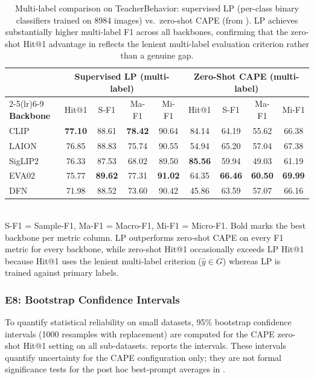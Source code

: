 \documentclass[electronics,article,submit,pdftex,moreauthors]{Definitions/mdpi}
\begin{document}
\begin{table}[H]
\caption{Multi-label comparison on TeacherBehavior: supervised LP (per-class binary classifiers trained on 8984 images) vs.\ zero-shot CAPE (from ). LP achieves substantially higher multi-label F1 across all backbones, confirming that the zero-shot Hit@1 advantage in  reflects the lenient multi-label evaluation criterion rather than a genuine gap.}
\label{tab:linear_probe_ml}
\centering
\small
\setlength{\tabcolsep}{3.5pt}
\begin{tabular}{l cccc cccc}
\toprule
 & \multicolumn{4}{c}{\textbf{Supervised LP (multi-label)}} & \multicolumn{4}{c}{\textbf{Zero-Shot CAPE (multi-label)}} \\
\cmidrule(lr){2-5}\cmidrule(lr){6-9}
\textbf{Backbone} & Hit@1 & S-F1 & Ma-F1 & Mi-F1 & Hit@1 & S-F1 & Ma-F1 & Mi-F1 \\
\midrule
CLIP & \textbf{77.10} & 88.61 & \textbf{78.42} & 90.64 & 84.14 & 64.19 & 55.62 & 66.38 \\
LAION & 76.85 & 88.83 & 75.74 & 90.55 & 54.94 & 65.20 & 57.04 & 67.38 \\
SigLIP2 & 76.33 & 87.53 & 68.02 & 89.50 & \textbf{85.56} & 59.94 & 49.03 & 61.19 \\
EVA02 & 75.77 & \textbf{89.62} & 77.31 & \textbf{91.02} & 64.35 & \textbf{66.46} & \textbf{60.50} & \textbf{69.99} \\
DFN & 71.98 & 88.52 & 73.60 & 90.42 & 45.86 & 63.59 & 57.07 & 66.16 \\
\bottomrule
\end{tabular}
\\[3pt]
{\footnotesize S-F1 = Sample-F1, Ma-F1 = Macro-F1, Mi-F1 = Micro-F1. Bold marks the best backbone per metric column. LP outperforms zero-shot CAPE on every F1 metric for every backbone, while zero-shot Hit@1 occasionally exceeds LP Hit@1 because Hit@1 uses the lenient multi-label criterion ($\hat{y}\in G$) whereas LP is trained against primary labels.}
\end{table}


\subsubsection{E8: Bootstrap Confidence Intervals}
\label{sec:e8_bootstrap}

To quantify statistical reliability on small datasets, 95\% bootstrap confidence intervals (1000 resamples with replacement) are computed for the CAPE zero-shot Hit@1 setting on all sub-datasets.  reports the intervals. These intervals quantify uncertainty for the CAPE configuration only; they are not formal significance tests for the post hoc best-prompt averages in .
\end{document}
